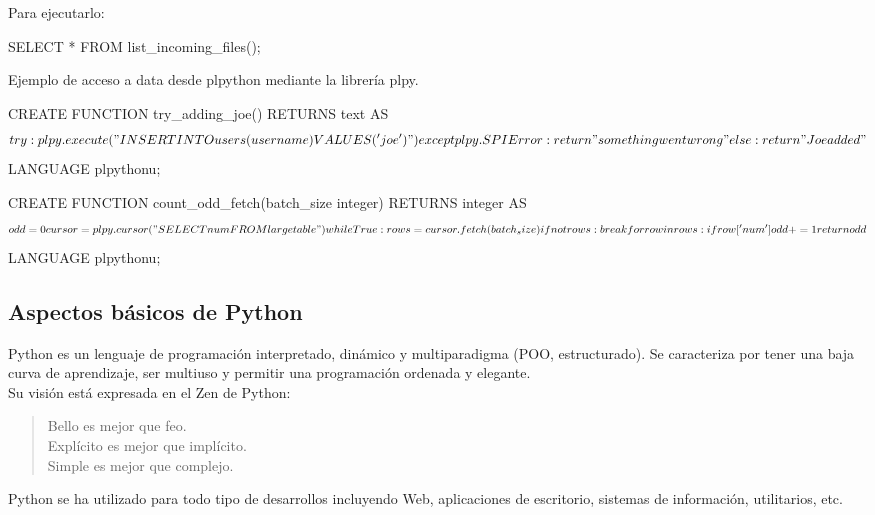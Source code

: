 Para ejecutarlo:\\

\begin{pyglist}
SELECT * FROM list_incoming_files();
\end{pyglist}

Ejemplo de acceso a data desde plpython mediante la librería plpy.\\

\begin{pyglist}[language=python]
CREATE FUNCTION try_adding_joe() RETURNS text AS $$
    try:
        plpy.execute("INSERT INTO users(username) VALUES ('joe')")
    except plpy.SPIError:
        return "something went wrong"
    else:
        return "Joe added"
$$ LANGUAGE plpythonu;
\end{pyglist}

\begin{pyglist}[language=python]
CREATE FUNCTION count_odd_fetch(batch_size integer) RETURNS integer AS $$
odd = 0
cursor = plpy.cursor("SELECT num FROM largetable")
while True:
    rows = cursor.fetch(batch_size)
    if not rows:
        break
    for row in rows:
        if row['num'] %
            odd += 1
return odd
$$ LANGUAGE plpythonu;
\end{pyglist}



\subsection{Aspectos básicos de Python}

Python es un lenguaje de programación interpretado, dinámico y multiparadigma (POO, estructurado). Se caracteriza por tener una baja curva de aprendizaje, ser multiuso y permitir una programación ordenada y elegante.\\

Su visión está expresada en el Zen de Python:\\

\begin{quotation}
Bello es mejor que feo.\\
Explícito es mejor que implícito.\\
Simple es mejor que complejo.\\
\end{quotation}

Python se ha utilizado para todo tipo de desarrollos incluyendo Web, aplicaciones de escritorio, sistemas de información, utilitarios, etc.\\



